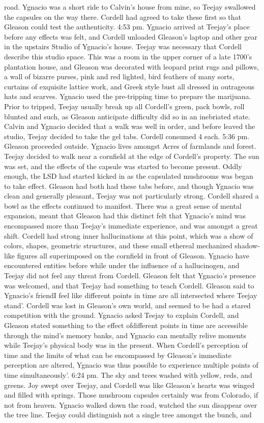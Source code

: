 \documentclass[12pt]{book}
\begin{document}
road. Ygnacio was a short ride to Calvin's house from mine, so Teejay swallowed the capsules on the way there. Cordell had agreed to take these first so that Gleason could test the authenticity. 4:53 pm. Ygnacio arrived at Teejay's place before any effects was felt, and Cordell unloaded Gleason's laptop and other gear in the upstairs Studio of Ygnacio's house. Teejay was necessary that Cordell describe this studio space. This was a room in the upper corner of a late 1700's plantation house, and Gleason was decorated with leopard print rugs and pillows, a wall of bizarre purses, pink and red lighted, bird feathers of many sorts, curtains of exquisite lattice work, and Greek style bust all dressed in outrageous hats and scarves. Ygnacio used the pre-tripping time to prepare the marijuana. Prior to tripped, Teejay usually break up all Cordell's green, pack bowls, roll blunted and such, as Gleason anticipate difficulty did so in an inebriated state. Calvin and Ygnacio decided that a walk was well in order, and before leaved the studio, Teejay decided to take the gel tabs. Cordell consumed 4 each. 5:36 pm. Gleason proceeded outside. Ygnacio lives amongst Acres of farmlands and forest. Teejay decided to walk near a cornfield at the edge of Cordell's property. The sun was set, and the effects of the capsule was started to become present. Oddly enough, the LSD had started kicked in as the capsulated mushrooms was began to take effect. Gleason had both had these tabs before, and though Ygnacio was clean and generally pleasant, Teejay was not particularly strong. Cordell shared a bowl as the effects continued to manifest. There was a great sense of mental expansion, meant that Gleason had this distinct felt that Ygnacio's mind was encompassed more than Teejay's immediate experience, and was amongst a great shift. Cordell had strong inner hallucinations at this point, which was a show of colors, shapes, geometric structures, and these small ethereal mechanized shadow-like figures all superimposed on the cornfield in front of Gleason. Ygnacio have encountered entities before while under the influence of a hallucinogen, and Teejay did not feel any threat from Cordell. Gleason felt that Ygnacio's presence was welcomed, and that Teejay had something to teach Cordell. Gleason said to Ygnacio's friendI feel like different points in time are all intersected where Teejay stand'. Cordell was lost in Gleason's own world, and seemed to be had a stared competition with the ground. Ygnacio asked Teejay to explain Cordell, and Gleason stated something to the effect ofdifferent points in time are accessible through the mind's memory banks, and Ygnacio can mentally relive moments while Teejay's physical body was in the present. When Cordell's perception of time and the limits of what can be encompassed by Gleason's immediate perception are altered, Ygnacio was thus possible to experience multiple points of time simultaneously'. 6:24 pm. The sky and trees washed with yellow, reds, and greens. Joy swept over Teejay, and Cordell was like Gleason's hearts was winged and filled with springs. Those mushroom capsules certainly was from Colorado, if not from heaven. Ygnacio walked down the road, watched the sun disappear over the tree line. Teejay could distinguish not a single tree amongst the bunch, and 
\end{document}
